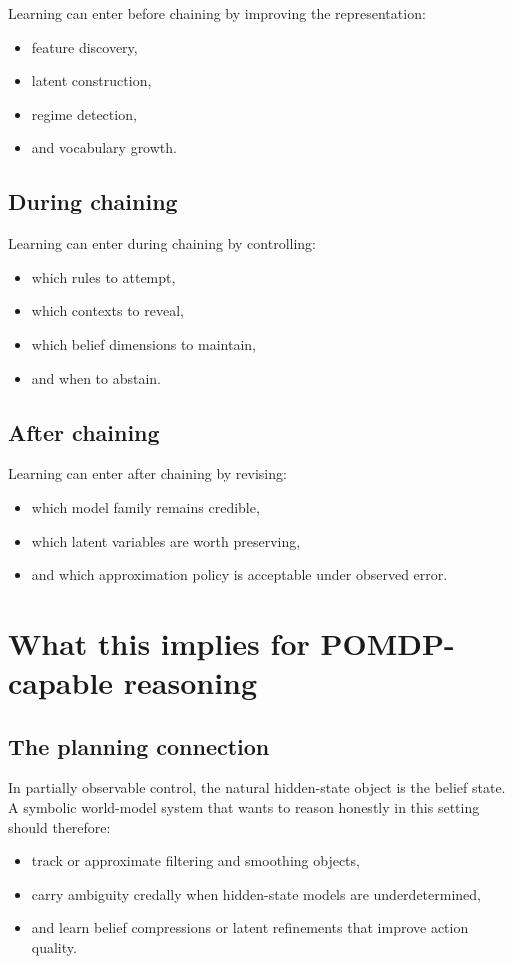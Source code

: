 \documentclass[11pt]{article}
\begin{document}
Learning can enter before chaining by improving the representation:
\begin{itemize}
  \item feature discovery,
  \item latent construction,
  \item regime detection,
  \item and vocabulary growth.
\end{itemize}

\subsection{During chaining}

Learning can enter during chaining by controlling:
\begin{itemize}
  \item which rules to attempt,
  \item which contexts to reveal,
  \item which belief dimensions to maintain,
  \item and when to abstain.
\end{itemize}

\subsection{After chaining}

Learning can enter after chaining by revising:
\begin{itemize}
  \item which model family remains credible,
  \item which latent variables are worth preserving,
  \item and which approximation policy is acceptable under observed error.
\end{itemize}

\section{What this implies for POMDP-capable reasoning}

\subsection{The planning connection}

In partially observable control, the natural hidden-state object is the belief
state.  A symbolic world-model system that wants to reason honestly in this
setting should therefore:
\begin{itemize}
  \item track or approximate filtering and smoothing objects,
  \item carry ambiguity credally when hidden-state models are underdetermined,
  \item and learn belief compressions or latent refinements that improve action
        quality.
\end{itemize}
\end{document}
